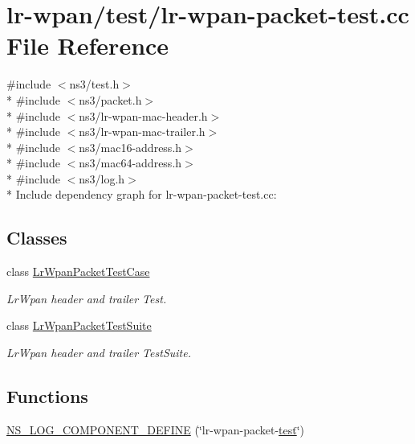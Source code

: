 \hypertarget{lr-wpan-packet-test_8cc}{}\section{lr-\/wpan/test/lr-\/wpan-\/packet-\/test.cc File Reference}
\label{lr-wpan-packet-test_8cc}
{\ttfamily \#include $<$ns3/test.\+h$>$}\\*
{\ttfamily \#include $<$ns3/packet.\+h$>$}\\*
{\ttfamily \#include $<$ns3/lr-\/wpan-\/mac-\/header.\+h$>$}\\*
{\ttfamily \#include $<$ns3/lr-\/wpan-\/mac-\/trailer.\+h$>$}\\*
{\ttfamily \#include $<$ns3/mac16-\/address.\+h$>$}\\*
{\ttfamily \#include $<$ns3/mac64-\/address.\+h$>$}\\*
{\ttfamily \#include $<$ns3/log.\+h$>$}\\*
Include dependency graph for lr-\/wpan-\/packet-\/test.cc\+:
\subsection*{Classes}
\begin{DoxyCompactItemize}
\item 
class \hyperlink{classLrWpanPacketTestCase}{Lr\+Wpan\+Packet\+Test\+Case}
\begin{DoxyCompactList}\small\item\em Lr\+Wpan header and trailer Test. \end{DoxyCompactList}\item 
class \hyperlink{classLrWpanPacketTestSuite}{Lr\+Wpan\+Packet\+Test\+Suite}
\begin{DoxyCompactList}\small\item\em Lr\+Wpan header and trailer Test\+Suite. \end{DoxyCompactList}\end{DoxyCompactItemize}
\subsection*{Functions}
\begin{DoxyCompactItemize}
\item 
\hyperlink{lr-wpan-packet-test_8cc_a3556362fa5286af5cbafd62321ec9f64}{N\+S\+\_\+\+L\+O\+G\+\_\+\+C\+O\+M\+P\+O\+N\+E\+N\+T\+\_\+\+D\+E\+F\+I\+NE} (\char`\"{}lr-\/wpan-\/packet-\/\hyperlink{main-test-sync_8cc_a708a4c1a4d0c4acc4c447310dd4db27f}{test}\char`\"{})
\end{DoxyCompactItemize}
